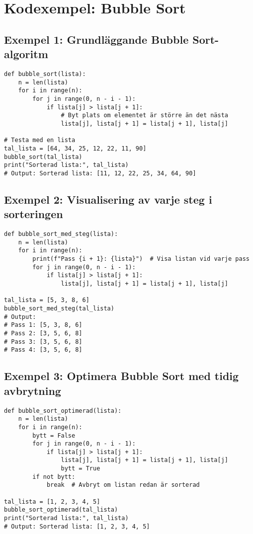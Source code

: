 \section{Kodexempel: Bubble Sort}
\label{examples:bubblesort}
\subsection*{Exempel 1: Grundläggande Bubble Sort-algoritm}

\begin{lstlisting}[title=Bubble Sort - Grundläggande implementation]
def bubble_sort(lista):
    n = len(lista)
    for i in range(n):
        for j in range(0, n - i - 1):
            if lista[j] > lista[j + 1]:
                # Byt plats om elementet är större än det nästa
                lista[j], lista[j + 1] = lista[j + 1], lista[j]

# Testa med en lista
tal_lista = [64, 34, 25, 12, 22, 11, 90]
bubble_sort(tal_lista)
print("Sorterad lista:", tal_lista)
# Output: Sorterad lista: [11, 12, 22, 25, 34, 64, 90]
\end{lstlisting}

\subsection*{Exempel 2: Visualisering av varje steg i sorteringen}

\begin{lstlisting}[title=Bubble Sort - Visualisering av stegen]
def bubble_sort_med_steg(lista):
    n = len(lista)
    for i in range(n):
        print(f"Pass {i + 1}: {lista}")  # Visa listan vid varje pass
        for j in range(0, n - i - 1):
            if lista[j] > lista[j + 1]:
                lista[j], lista[j + 1] = lista[j + 1], lista[j]

tal_lista = [5, 3, 8, 6]
bubble_sort_med_steg(tal_lista)
# Output:
# Pass 1: [5, 3, 8, 6]
# Pass 2: [3, 5, 6, 8]
# Pass 3: [3, 5, 6, 8]
# Pass 4: [3, 5, 6, 8]
\end{lstlisting}

\subsection*{Exempel 3: Optimera Bubble Sort med tidig avbrytning}

\begin{lstlisting}[title=Bubble Sort - Optimerad version]
def bubble_sort_optimerad(lista):
    n = len(lista)
    for i in range(n):
        bytt = False
        for j in range(0, n - i - 1):
            if lista[j] > lista[j + 1]:
                lista[j], lista[j + 1] = lista[j + 1], lista[j]
                bytt = True
        if not bytt:
            break  # Avbryt om listan redan är sorterad

tal_lista = [1, 2, 3, 4, 5]
bubble_sort_optimerad(tal_lista)
print("Sorterad lista:", tal_lista)
# Output: Sorterad lista: [1, 2, 3, 4, 5]
\end{lstlisting}

